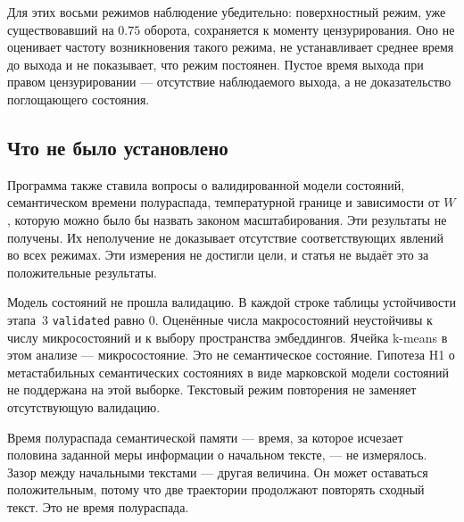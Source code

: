 \documentclass[10pt]{article}
\begin{document}
Для этих восьми режимов наблюдение убедительно:
поверхностный режим, уже существовавший на $0.75$ оборота,
сохраняется к моменту цензурирования. %
Оно не оценивает частоту возникновения такого режима,
не устанавливает среднее время до выхода и не показывает,
что режим постоянен.
Пустое время выхода при правом цензурировании ---
отсутствие наблюдаемого выхода, а не доказательство поглощающего состояния.

\subsection{Что не было установлено}
\label{sec:not}

Программа также ставила вопросы о валидированной модели состояний,
семантическом времени полураспада, температурной границе и зависимости
от $W$, которую можно было бы назвать законом масштабирования.
Эти результаты не получены.
Их неполучение не доказывает отсутствие соответствующих явлений
во всех режимах.
Эти измерения не достигли цели, и статья не выдаёт это за положительные результаты.

Модель состояний не прошла валидацию.
В каждой строке таблицы устойчивости этапа~3 \texttt{validated} равно $0$. %
Оценённые числа макросостояний неустойчивы к числу микросостояний
и к выбору пространства эмбеддингов.
Ячейка k-means в этом анализе --- микросостояние.
Это не семантическое состояние.
Гипотеза H1 о метастабильных семантических состояниях в виде марковской
модели состояний не поддержана на этой выборке.
Текстовый режим повторения не заменяет отсутствующую валидацию.

Время полураспада семантической памяти --- время,
за которое исчезает половина заданной меры информации о начальном тексте, ---
не измерялось.
Зазор между начальными текстами --- другая величина.
Он может оставаться положительным, потому что две траектории продолжают
повторять сходный текст.
Это не время полураспада.
\end{document}

